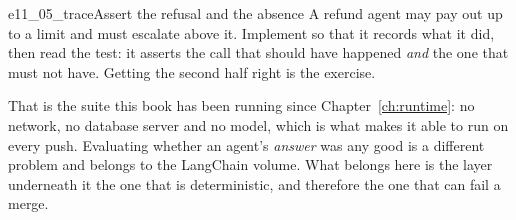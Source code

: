 \begin{exercise}{e11_05_trace}{Assert the refusal and the absence}
A refund agent may pay out up to a limit and must escalate above it.
Implement  so that it records what it did, then read
the test: it asserts the call that should have happened \emph{and} the one
that must not have. Getting the second half right is the exercise.
\end{exercise}

\noindent
That is the suite this book has been running since Chapter~\ref{ch:runtime}:
no network, no database server and no model, which is what makes it able to
run on every push. Evaluating whether an agent's \emph{answer} was any good
is a different problem and belongs to the LangChain volume. What belongs
here is the layer underneath it \dash{} the one that is deterministic, and
therefore the one that can fail a merge.
